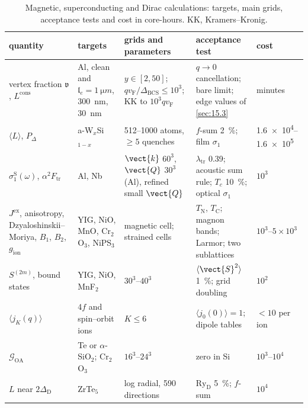 \begin{table}[t]
  \centering
  \caption{Magnetic, superconducting and Dirac calculations: targets, main grids, acceptance tests and cost in core-hours. KK, Kramers--Kronig.}
  \label{tab:E20-params}
  \small
  \setlength{\tabcolsep}{4pt}
  \begin{tabular}{p{}p{}p{}p{}p{}}
    \toprule
    quantity & targets & grids and parameters & acceptance test & cost \\
    \midrule
    vertex fraction $\mathfrak{v}$, $L^{\mathrm{cons}}$ & Al, clean and $\mathfrak{l}_e = \SI{1}{\micro m}$, \SI{300}{nm}, \SI{30}{nm} & $y \in [2,50]$; $qv_{\mathrm{F}}/\Delta_{\mathrm{BCS}} \le 10^3$; KK to $10^3qv_{\mathrm{F}}$ & $q\to0$ cancellation; bare limit; edge values of \cref{sec:15.3} & minutes \\
    $\langle L\rangle$, $P_\Delta$ & a-W$_x$Si$_{1-x}$ & 512--1000 atoms, ${\ge}5$ quenches & $f$-sum \SI{2}{\percent}; film $\sigma_1$ & \num{1.6e4}--\num{1.6e5} \\
    $\sigma_1^{\mathrm{S}}(\omega)$, $\alpha^2F_{\mathrm{tr}}$ & Al, Nb & $\vect{k}$ $60^3$, $\vect{Q}$ $30^3$ (Al), refined small $\vect{Q}$ & $\lambda_{\mathrm{tr}}$ 0.39; acoustic sum rule; $T_c$ \SI{10}{\percent}; optical $\sigma_1$ & $10^3$ \\
    $J^{\mathrm{ex}}$, anisotropy, Dzyaloshinskii--Moriya, $B_1$, $B_2$, $g_{\mathrm{ion}}$ & YIG, NiO, MnO, Cr$_2$O$_3$, NiPS$_3$ & magnetic cell; strained cells & $T_{\mathrm{N}}$, $T_{\mathrm{C}}$; magnon bands; Larmor; two sublattices & $10^3$--$5\times10^3$ \\
    $S^{(2m)}$, bound states & YIG, NiO, MnF$_2$ & $30^3$--$40^3$ & $\langle\vect{S}^2\rangle$ \SI{1}{\percent}; grid doubling & $10^2$ \\
    $\langle j_K(q)\rangle$ & $4f$ and spin--orbit ions & $K \le 6$ & $\langle j_0(0)\rangle = 1$; dipole tables & ${<}10$ per ion \\
    $\mathcal{G}_{\mathrm{OA}}$ & Te or $\alpha$-SiO$_2$; Cr$_2$O$_3$ & $16^3$--$24^3$ & zero in Si & $10^3$--$10^4$ \\
    $L$ near $2\Delta_{\mathrm{D}}$ & ZrTe$_5$ & log radial, 590 directions & $\mathrm{Ry}_{\mathrm{D}}$ \SI{5}{\percent}; $f$-sum & $10^4$ \\
    \bottomrule
  \end{tabular}
\end{table}
